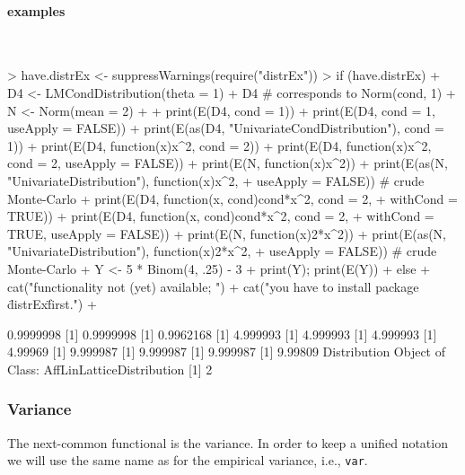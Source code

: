 \documentclass[11pt]{article}
\newcommand{\code}[1]{{\tt #1}}
\begin{document}
\paragraph{examples} $ \mbox{ }$\newline
\begin{Schunk}
\begin{Sinput}
> have.distrEx <- suppressWarnings(require("distrEx"))
> if (have.distrEx) 
+     {D4 <- LMCondDistribution(theta = 1)
+      D4  # corresponds to Norm(cond, 1)
+      N <- Norm(mean = 2)
+ 
+      print(E(D4, cond = 1))
+      print(E(D4, cond = 1, useApply = FALSE))
+      print(E(as(D4, "UnivariateCondDistribution"), cond = 1))
+      print(E(D4, function(x){x^2}, cond = 2))
+      print(E(D4, function(x){x^2}, cond = 2, useApply = FALSE))
+      print(E(N, function(x){x^2}))
+      print(E(as(N, "UnivariateDistribution"), function(x){x^2},
+        useApply = FALSE)) # crude Monte-Carlo
+      print(E(D4, function(x, cond){cond*x^2}, cond = 2,
+        withCond = TRUE))
+      print(E(D4, function(x, cond){cond*x^2}, cond = 2,
+        withCond = TRUE, useApply = FALSE))
+      print(E(N, function(x){2*x^2}))
+      print(E(as(N, "UnivariateDistribution"), function(x){2*x^2},
+        useApply = FALSE)) # crude Monte-Carlo
+      Y <- 5 * Binom(4, .25) - 3
+      print(Y); print(E(Y))  
+     } else {
+     cat("\n functionality not (yet) available; ")
+     cat("you have to install package \"distrEx\" first.\n")
+     }
\end{Sinput}
\begin{Soutput}
[1] 0.9999998
[1] 0.9999998
[1] 0.9962168
[1] 4.999993
[1] 4.999993
[1] 4.999993
[1] 4.99969
[1] 9.999987
[1] 9.999987
[1] 9.999987
[1] 9.99809
Distribution Object of Class: AffLinLatticeDistribution
[1] 2
\end{Soutput}
\end{Schunk}
%
%
\subsubsection{Variance}
The next-common functional is the variance. In order to keep a unified
notation we will use the same name as for the empirical variance, i.e.,
 \code{var}.
\end{document}

